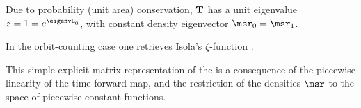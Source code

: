 {Due to probability (unit area) conservation, ${\bf T}$ has a unit eigenvalue
$z=1=e^{\eigenvL_0}$,
with constant density eigen\-vector $\msr_0 =\msr_1$.


In the orbit-counting case one retrieves Isola's {$\zeta$}-function
.

This simple explicit matrix representation of the  {\FPoper} is
a consequence of the piecewise linearity of the time-forward map,
and the restriction of the densities
$\msr$ to the space of  piecewise constant functions.
} %


